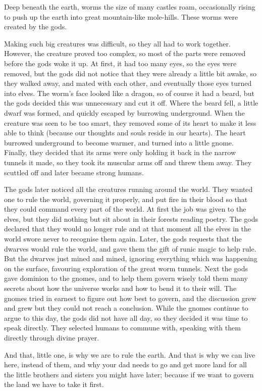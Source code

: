 Deep beneath the earth, worms the size of many castles roam, occasionally rising to push up the earth into great mountain-like mole-hills.  These worms were created by the gods.

	Making such big creatures was difficult, so they all had to work together.  However, the creature proved too complex, so most of the parts were removed before the gods woke it up.  At first, it had too many eyes, so the eyes were removed, but the gods did not notice that they were already a little bit awake, so they walked away, and mated with each other, and eventually those eyes turned into elves.  The worm's face looked like a dragon, so of course it had a beard, but the gods decided this was unnecessary and cut it off.  Where the beard fell, a little dwarf was formed, and quickly escaped by burrowing underground.  When the creature was seen to be too smart, they removed some of its heart to make it less able to think (because our thoughts and souls reside in our hearts).  The heart burrowed underground to become warmer, and turned into a little gnome.  Finally, they decided that its arms were only holding it back in the narrow tunnels it made, so they took its muscular arms off and threw them away.  They scuttled off and later became strong humans.

	The gods later noticed all the creatures running around the world.  They wanted one to rule the world, governing it properly, and put fire in their blood so that they could command every part of the world.  At first the job was given to the elves, but they did nothing but sit about in their forests reading poetry.  The gods declared that they would no longer rule and at that moment all the elves in the world swore never to recognise them again.  Later, the gods requests that the dwarves would rule the world, and gave them the gift of runic magic to help rule.  But the dwarves just mined and mined, ignoring everything which was happening on the surface, favouring exploration of the great worm tunnels.  Next the gods gave dominion to the gnomes, and to help them govern wisely told them many secrets about how the universe works and how to bend it to their will.  The gnomes tried in earnest to figure out how best to govern, and the discussion grew and grew but they could not reach a conclusion.  While the gnomes continue to argue to this day, the gods did not have all day, so they decided it was time to speak directly.  They selected humans to commune with, speaking with them directly through divine prayer.

	And that, little one, is why we are to rule the earth.  And that is why we can live here, instead of them, and why your dad needs to go and get more land for all the little brothers and sisters you might have later; because if we want to govern the land we have to take it first.

